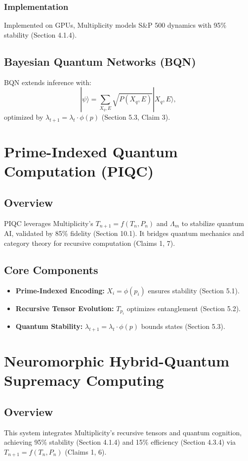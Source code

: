 \documentclass{article}
\theoremstyle{plain}
\theoremstyle{claimstyle}
\begin{document}
\subsubsection{Implementation}
Implemented on GPUs, Multiplicity models S\&P 500 dynamics with 95\% stability (Section 4.1.4).

\subsection{Bayesian Quantum Networks (BQN)}
BQN extends inference with:
\begin{equation}
    |\psi\rangle = \sum_{X_q, E} \sqrt{P(X_q, E)} |X_q, E\rangle,
\end{equation}
optimized by \(\lambda_{t+1} = \lambda_t \cdot \phi(p)\) (Section 5.3, Claim 3).

\section{Prime-Indexed Quantum Computation (PIQC)}
\subsection{Overview}
PIQC leverages Multiplicity’s \( T_{n+1} = f(T_n, P_n) \) and \(\Lambda_m\) to stabilize quantum AI, validated by 85\% fidelity (Section 10.1). It bridges quantum mechanics and category theory for recursive computation (Claims 1, 7).

\subsection{Core Components}
\begin{itemize}
    \item \textbf{Prime-Indexed Encoding:} \( X_i = \phi(p_i) \) ensures stability (Section 5.1).
    \item \textbf{Recursive Tensor Evolution:} \( T_{p_i} \) optimizes entanglement (Section 5.2).
    \item \textbf{Quantum Stability:} \(\lambda_{t+1} = \lambda_t \cdot \phi(p)\) bounds states (Section 5.3).
\end{itemize}

\section{Neuromorphic Hybrid-Quantum Supremacy Computing}
\subsection{Overview}
This system integrates Multiplicity’s recursive tensors and quantum cognition, achieving 95\% stability (Section 4.1.4) and 15\% efficiency (Section 4.3.4) via \( T_{n+1} = f(T_n, P_n) \) (Claims 1, 6).
\end{document}
